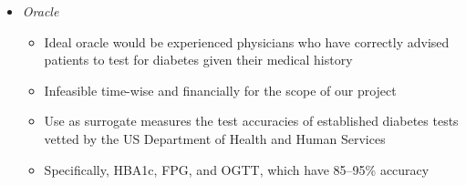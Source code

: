 \documentclass[a0]{a0poster}
\begin{document}
\begin{textblock}{7.0}
\begin{itemize}
  \item \emph{Oracle}
  \begin{itemize}
    \item Ideal oracle would be experienced physicians who have correctly advised patients to test for diabetes given their medical history
    \item Infeasible time-wise and financially for the scope of our project
    \item Use as surrogate measures the test accuracies of established diabetes tests vetted by the US Department of Health and Human Services
    \item Specifically, HBA1c, FPG, and OGTT, which have 85--95\% accuracy
  \end{itemize}

\end{itemize}

\end{textblock}
\end{document}
